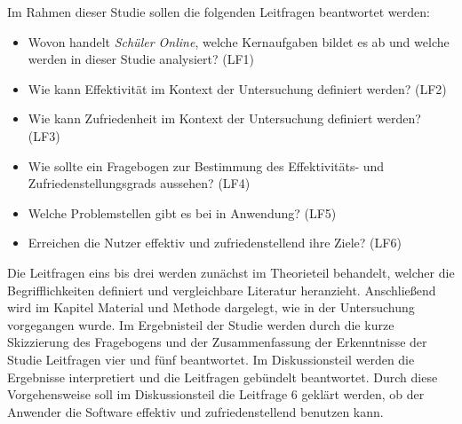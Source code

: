 Im Rahmen dieser Studie sollen die folgenden Leitfragen beantwortet werden: 
\begin{itemize}
    \item Wovon handelt \textit{Schüler Online}, welche Kernaufgaben bildet es ab und welche werden in dieser Studie analysiert? (LF1)%
    \item Wie kann Effektivität im Kontext der Untersuchung definiert werden? (LF2)%
    \item Wie kann Zufriedenheit im Kontext der Untersuchung definiert werden? (LF3)%
    \item Wie sollte ein Fragebogen zur Bestimmung des Effektivitäts- und Zufriedenstellungsgrads aussehen? (LF4)%
    \item Welche Problemstellen gibt es bei in Anwendung? (LF5)%
    \item Erreichen die Nutzer effektiv und zufriedenstellend ihre Ziele? (LF6)%
\end{itemize}

Die Leitfragen eins bis drei werden zunächst im Theorieteil behandelt, welcher die Begrifflichkeiten definiert und vergleichbare Literatur heranzieht. Anschließend wird im Kapitel Material und Methode dargelegt, wie in der Untersuchung vorgegangen wurde. Im Ergebnisteil der Studie werden durch die kurze Skizzierung des Fragebogens und der Zusammenfassung der Erkenntnisse der Studie Leitfragen vier und fünf beantwortet. Im Diskussionsteil werden die Ergebnisse interpretiert und die Leitfragen gebündelt beantwortet. Durch diese Vorgehensweise soll im Diskussionsteil die Leitfrage 6 geklärt werden, ob der Anwender die Software effektiv und zufriedenstellend benutzen kann.

